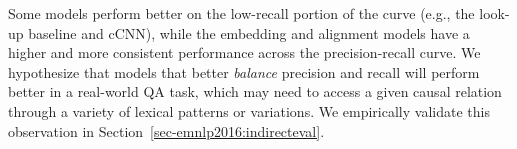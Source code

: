 Some models perform better on the low-recall portion of the curve (e.g., the look-up baseline and cCNN), while the embedding and alignment models have a higher and more consistent performance across the precision-recall curve. We hypothesize that models that better \emph{balance} precision and recall will perform better in a real-world QA task, which may need to access a given causal relation through a variety of lexical patterns or variations. We empirically validate this observation in Section~\ref{sec-emnlp2016:indirecteval}.









